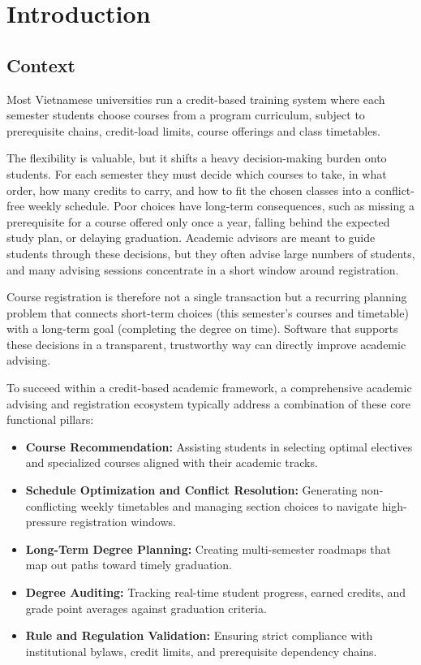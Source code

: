 \section{Introduction}
\label{sec:intro}
    \subsection{Context}
\hspace{\parindent}Most Vietnamese universities run a credit-based training system where each semester students choose courses from a program curriculum, subject to prerequisite chains, credit-load limits, course offerings and class timetables.

The flexibility is valuable, but it shifts a heavy decision-making burden onto students. For each semester they must decide which courses to take, in what order, how many credits to carry, and how to fit the chosen classes into a conflict-free weekly schedule. Poor choices have long-term consequences, such as missing a prerequisite for a course offered only once a year, falling behind the expected study plan, or delaying graduation. Academic advisors are meant to guide students through these decisions, but they often advise large numbers of students, and many advising sessions concentrate in a short window around registration.

Course registration is therefore not a single transaction but a recurring planning problem that connects short-term choices (this semester's courses and timetable) with a long-term goal (completing the degree on time). Software that supports these decisions in a transparent, trustworthy way can directly improve academic advising.

To succeed within a credit-based academic framework, a comprehensive academic advising and registration ecosystem typically address a combination of these core functional pillars:
\begin{itemize}
    \item \textbf{Course Recommendation:} Assisting students in selecting optimal electives and specialized courses aligned with their academic tracks.
    \item \textbf{Schedule Optimization and Conflict Resolution:} Generating non-conflicting weekly timetables and managing section choices to navigate high-pressure registration windows.
    \item \textbf{Long-Term Degree Planning:} Creating multi-semester roadmaps that map out paths toward timely graduation.
    \item \textbf{Degree Auditing:} Tracking real-time student progress, earned credits, and grade point averages against graduation criteria.
    \item \textbf{Rule and Regulation Validation:} Ensuring strict compliance with institutional bylaws, credit limits, and prerequisite dependency chains.
\end{itemize}


